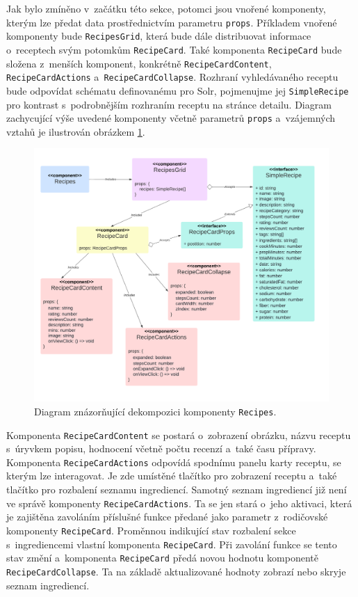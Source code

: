 Jak bylo zmíněno v~začátku této sekce, potomci jsou vnořené komponenty, kterým lze předat data prostřednictvím parametru \texttt{props}. Příkladem vnořené komponenty bude \texttt{RecipesGrid}, která bude dále distribuovat informace o~receptech svým potomkům \texttt{RecipeCard}. Také komponenta \texttt{RecipeCard} bude složena z~menších komponent, konkrétně \texttt{RecipeCardContent}, \texttt{RecipeCardActions} a~\texttt{RecipeCardCollapse}. Rozhraní vyhledávaného receptu bude odpovídat schématu definovanému pro Solr, pojmenujme jej \texttt{SimpleRecipe} pro kontrast s~podrobnějším rozhraním receptu na stránce detailu. Diagram zachycující výše uvedené komponenty včetně parametrů \texttt{props} a~vzájemných vztahů je ilustrován obrázkem \ref{obr02:recipes-component}.

\begin{figure}[h!]\centering
\includegraphics[width=145mm]{../img/recipes-component}
\caption{Diagram znázorňující dekompozici komponenty \texttt{Recipes}.}
\label{obr02:recipes-component}
\end{figure}

Komponenta \texttt{RecipeCardContent} se postará o~zobrazení obrázku, názvu receptu s~úryvkem popisu, hodnocení včetně počtu recenzí a~také času přípravy. Komponenta \texttt{RecipeCardActions} odpovídá spodnímu panelu karty receptu, se kterým lze interagovat. Je zde umístěné tlačítko pro zobrazení receptu a~také tlačítko pro rozbalení seznamu ingrediencí. Samotný seznam ingrediencí již není ve správě komponenty \texttt{RecipeCardActions}. Ta se jen stará o~jeho aktivaci, která je zajištěna zavoláním příslušné funkce předané jako parametr z~rodičovské komponenty \texttt{RecipeCard}. Proměnnou indikující stav rozbalení sekce s~ingrediencemi vlastní komponenta \texttt{RecipeCard}. Při zavolání funkce se tento stav změní a~komponenta \texttt{RecipeCard} předá novou hodnotu komponentě \texttt{RecipeCardCollapse}. Ta na základě aktualizované hodnoty zobrazí nebo skryje seznam ingrediencí.

